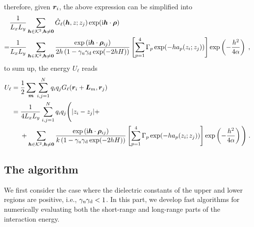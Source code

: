 therefore, given $\bm{r}_i$, the above expression can be simplified into
\begin{align*}
 &\frac{1}{ L_xL_y}   \sum_{\boldsymbol{h}\in\mathcal{K}^2,\boldsymbol{h}\neq\bm{0}} \Hat{G}_\ell(\boldsymbol{h},z;z_j)\exp(\textrm{i}\boldsymbol{h}\cdot \bm{\rho})\\
 =& \frac{1}{ L_xL_y}   \sum_{\boldsymbol{h}\in\mathcal{K}^2,\boldsymbol{h}\neq\bm{0}} \frac{ \exp{(\mathrm{i} \boldsymbol{h} \cdot \boldsymbol{\rho}_{ij})}}{2h \left(1-\gamma_{\mathrm{u}}\gamma_{\mathrm{d}}\exp(-2hH)\right)}\left[\sum_{p=1}^4\Gamma_p\exp(-ha_p(z_i;z_j))\right] \exp\left(-\frac{h^2}{4\alpha}\right)\;,
\end{align*}
to sum up, the energy $U_\ell$ reads
\begin{align*}
    U_\ell&=\frac{1}{2}\sum_{\bm{m}}\sum_{i,j=1}^N q_iq_j G_\ell(\boldsymbol{r}_i+\bm{L}_m, \boldsymbol{r}_j)\\
    &=\frac{1}{4  L_xL_y}\sum_{i,j=1}^N  q_iq_j \Bigg({\left\lvert z_i-z_j\right\rvert} +\\&~~~~+  \sum_{\boldsymbol{h}\in\mathcal{K}^2,\boldsymbol{h}\neq\bm{0}} \frac{ \exp{(\mathrm{i} \boldsymbol{h} \cdot \boldsymbol{\rho}_{ij})}}{k\left(1-\gamma_{\mathrm{u}}\gamma_{\mathrm{d}}\exp(-2hH)\right)}\left[\sum_{p=1}^4\Gamma_p\exp(-ha_p(z_i;z_j))\right] \exp\left(-\frac{h^2}{4\alpha}\right)\Bigg)\;.
\end{align*}


\subsection{The algorithm}

We first consider the case where the dielectric constants of the upper and lower regions are positive, i.e., $\gamma_{\mathrm{u}} \gamma_{\mathrm{d}} < 1$. 
In this part, we develop fast algorithms for numerically evaluating both the short-range and long-range parts of the interaction energy.

